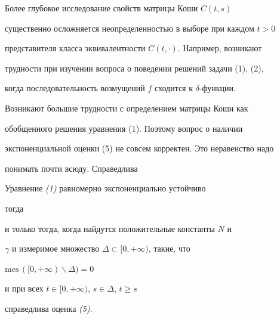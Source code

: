 Более глубокое исследование свойств матрицы Коши $C(t,s)$


существенно осложняется неопределенностью в выборе при каждом $t>0$


представителя класса эквивалентности $C(t,\cdot)$. Например, возникают


трудности при изучении вопроса о поведении решений задачи (1), (2),


когда последовательность возмущений $f$ сходится к $\delta$-функции.


Возникают большие трудности с определением матрицы Коши как


обобщенного решения уравнения (1). Поэтому вопрос о наличии


экспоненциальной оценки (5) не совсем корректен. Это неравенство надо


понимать почти всюду. Справедлива





\begin{lemnonum} Уравнение {\em (1)} равномерно экспоненциально устойчиво


тогда


и только тогда, когда найдутся положительные константы $N$ и


$\gamma$ и измеримое множество $\Delta\subset[0,+\infty)$, такие, что


$\text{mes}\,([0,+\infty)\backslash\Delta)=0$


и при всех $t\in[0,+\infty)$, $s\in\Delta$, $t\ge s$


справедлива оценка {\em (5)}.


\end{lemnonum}





